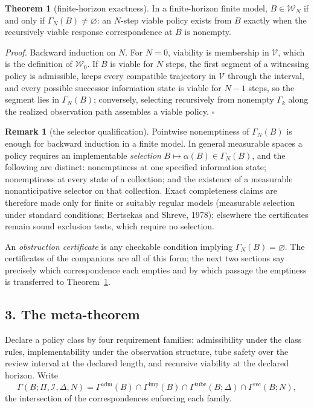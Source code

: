 \documentclass[10pt,twocolumn]{article}
\theoremstyle{definition}
\newtheorem{theorem}{Theorem}
\newtheorem{remark}{Remark}
\begin{document}
\begin{theorem}[finite-horizon exactness]\label{thm:exact}
In a finite-horizon finite model, \(B \in \mathscr{W}_{N}\) if and only if
\(\Gamma_{N}(B) \neq \varnothing\): an \(N\)-step viable policy exists from
\(B\) exactly when the recursively viable response correspondence at \(B\)
is nonempty.
\end{theorem}

\emph{Proof.} Backward induction on \(N\). For \(N = 0\), viability is
membership in \(\mathcal{V}\), which is the definition of
\(\mathscr{W}_0\). If \(B\) is viable for \(N\) steps, the first segment of
a witnessing policy is admissible, keeps every compatible trajectory in
\(\mathcal{V}\) through the interval, and every possible successor
information state is viable for \(N - 1\) steps, so the segment lies in
\(\Gamma_{N}(B)\); conversely, selecting recursively from nonempty
\(\Gamma_{k}\) along the realized observation path assembles a viable
policy. \hfill\(\square\)

\begin{remark}[the selector qualification]\label{rem:selection}
Pointwise nonemptiness of \(\Gamma_{N}(B)\) is enough for backward induction
in a finite model. In general measurable spaces a policy requires an
implementable \emph{selection} \(B \mapsto \alpha(B) \in \Gamma_{N}(B)\),
and the following are distinct: nonemptiness at one specified information
state; nonemptiness at every state of a collection; and the existence of a
measurable nonanticipative selector on that collection. Exact completeness
claims are therefore made only for finite or suitably regular models
(measurable selection under standard conditions; Bertsekas and Shreve,
1978); elsewhere the certificates remain sound exclusion tests, which
require no selection.
\end{remark}

An \emph{obstruction certificate} is any checkable condition implying
\(\Gamma_{N}(B) = \varnothing\). The certificates of the companions are all
of this form; the next two sections say precisely which correspondence each
empties and by which passage the emptiness is transferred to
Theorem~\ref{thm:exact}.

\subsection{3. The meta-theorem}\label{meta}

Declare a policy class by four requirement families: admissibility under the
class rules, implementability under the observation structure, tube safety
over the review interval at the declared length, and recursive viability at
the declared horizon. Write
\[
\Gamma(B; \Pi, \mathcal{I}, \Delta, N)
= \Gamma^{\mathrm{adm}}(B) \cap \Gamma^{\mathrm{imp}}(B)
\cap \Gamma^{\mathrm{tube}}(B; \Delta) \cap \Gamma^{\mathrm{rec}}(B; N),
\]
the intersection of the correspondences enforcing each family.
\end{document}
